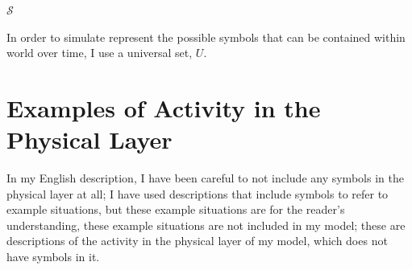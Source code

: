 $\mathcal{S}$

In order to simulate represent the possible symbols that can be
contained within world over time, I use a universal set, $U$.


\section{Examples of Activity in the Physical Layer}

In my English description, I have been careful to not include any
symbols in the physical layer at all; I have used descriptions that
include symbols to refer to example situations, but these example
situations are for the reader's understanding, these example
situations are not included in my model; these are descriptions of the
activity in the physical layer of my model, which does not have
symbols in it.
